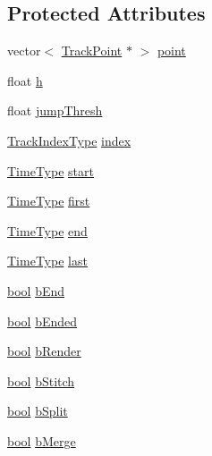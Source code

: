 \subsection*{Protected Attributes}
\begin{DoxyCompactItemize}
\item 
vector$<$ \hyperlink{class__sbsms___1_1_track_point}{Track\+Point} $\ast$ $>$ \hyperlink{class__sbsms___1_1_track_a43f2ce38605ca228eb6be02a490591ab}{point}
\item 
float \hyperlink{class__sbsms___1_1_track_ae66255351001740ba650b694987a43df}{h}
\item 
float \hyperlink{class__sbsms___1_1_track_ae8c364ce671473ccef5a412d10a41a0f}{jump\+Thresh}
\item 
\hyperlink{namespace__sbsms___a92908dbd644f9cd709ffe3608e9e4510}{Track\+Index\+Type} \hyperlink{class__sbsms___1_1_track_ac88f811c1500da75972b991e9a825035}{index}
\item 
\hyperlink{namespace__sbsms___a3a161c3deff71e932c0ec86aad54eb7c}{Time\+Type} \hyperlink{class__sbsms___1_1_track_a6bee6547dd2d96175c2930c46dcdca8b}{start}
\item 
\hyperlink{namespace__sbsms___a3a161c3deff71e932c0ec86aad54eb7c}{Time\+Type} \hyperlink{class__sbsms___1_1_track_a4924e659d27bdab7453bf99f6465ff1a}{first}
\item 
\hyperlink{namespace__sbsms___a3a161c3deff71e932c0ec86aad54eb7c}{Time\+Type} \hyperlink{class__sbsms___1_1_track_ab09b5d4e53062aaf67aa40da1dbc03c7}{end}
\item 
\hyperlink{namespace__sbsms___a3a161c3deff71e932c0ec86aad54eb7c}{Time\+Type} \hyperlink{class__sbsms___1_1_track_a14fe4801125d8272d8fdc33bb612d539}{last}
\item 
\hyperlink{mac_2config_2i386_2lib-src_2libsoxr_2soxr-config_8h_abb452686968e48b67397da5f97445f5b}{bool} \hyperlink{class__sbsms___1_1_track_ab28b8a158bc9f59e7372465be564b0e1}{b\+End}
\item 
\hyperlink{mac_2config_2i386_2lib-src_2libsoxr_2soxr-config_8h_abb452686968e48b67397da5f97445f5b}{bool} \hyperlink{class__sbsms___1_1_track_ae8d665c8b3044b27980572c57d54cb18}{b\+Ended}
\item 
\hyperlink{mac_2config_2i386_2lib-src_2libsoxr_2soxr-config_8h_abb452686968e48b67397da5f97445f5b}{bool} \hyperlink{class__sbsms___1_1_track_aa78f884f873b8c405cdefbadfb8f3c96}{b\+Render}
\item 
\hyperlink{mac_2config_2i386_2lib-src_2libsoxr_2soxr-config_8h_abb452686968e48b67397da5f97445f5b}{bool} \hyperlink{class__sbsms___1_1_track_aa9742b1b2512119291b7bb97427765e9}{b\+Stitch}
\item 
\hyperlink{mac_2config_2i386_2lib-src_2libsoxr_2soxr-config_8h_abb452686968e48b67397da5f97445f5b}{bool} \hyperlink{class__sbsms___1_1_track_ab5ead9b7ff9fad4577c2d80eb230a598}{b\+Split}
\item 
\hyperlink{mac_2config_2i386_2lib-src_2libsoxr_2soxr-config_8h_abb452686968e48b67397da5f97445f5b}{bool} \hyperlink{class__sbsms___1_1_track_a5d78b7dbd40cdd198d8c5e3767835029}{b\+Merge}
\end{DoxyCompactItemize}
